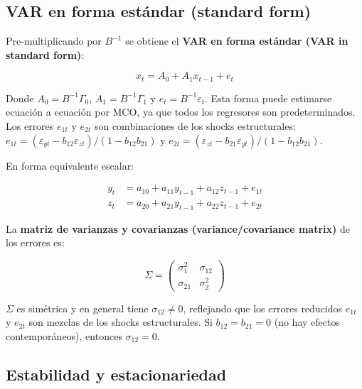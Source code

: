 \documentclass[12pt]{article}
\begin{document}
\subsection{VAR en forma est\'andar (standard form)}

Pre-multiplicando por $B^{-1}$ se obtiene el \textbf{VAR en forma est\'andar (VAR in standard form)}:

\begin{equation}
x_t = A_0 + A_1 x_{t-1} + e_t
\end{equation}

\begin{intuicionmat}
Donde $A_0 = B^{-1}\Gamma_0$, $A_1 = B^{-1}\Gamma_1$ y $e_t = B^{-1}\varepsilon_t$. Esta forma puede estimarse ecuaci\'on a ecuaci\'on por MCO, ya que todos los regresores son predeterminados. Los errores $e_{1t}$ y $e_{2t}$ son combinaciones de los shocks estructurales: $e_{1t} = (\varepsilon_{yt} - b_{12}\varepsilon_{zt})/(1-b_{12}b_{21})$ y $e_{2t} = (\varepsilon_{zt} - b_{21}\varepsilon_{yt})/(1-b_{12}b_{21})$.
\end{intuicionmat}

En forma equivalente escalar:

\begin{align}
y_t &= a_{10} + a_{11}y_{t-1} + a_{12}z_{t-1} + e_{1t} \\
z_t &= a_{20} + a_{21}y_{t-1} + a_{22}z_{t-1} + e_{2t}
\end{align}

La \textbf{matriz de varianzas y covarianzas (variance/covariance matrix)} de los errores es:

\begin{equation}
\Sigma = \begin{pmatrix} \sigma_1^2 & \sigma_{12} \\ \sigma_{21} & \sigma_2^2 \end{pmatrix}
\end{equation}

\begin{intuicionmat}
$\Sigma$ es sim\'etrica y en general tiene $\sigma_{12} \neq 0$, reflejando que los errores reducidos $e_{1t}$ y $e_{2t}$ son mezclas de los shocks estructurales. Si $b_{12} = b_{21} = 0$ (no hay efectos contempor\'aneos), entonces $\sigma_{12} = 0$.
\end{intuicionmat}

\subsection{Estabilidad y estacionariedad}
\end{document}
